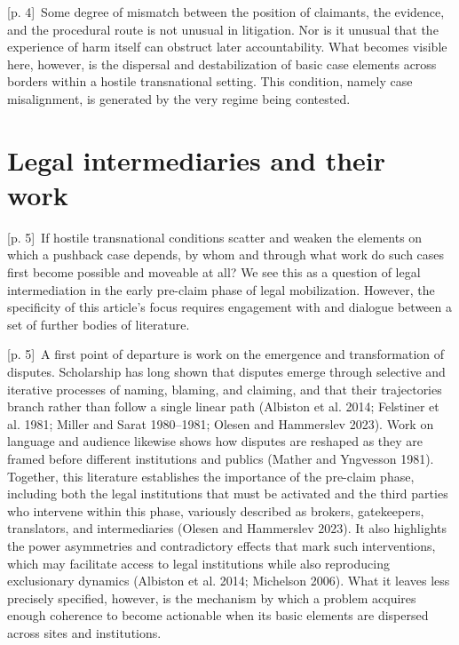 \documentclass[10pt,a4paper]{article}
\begin{document}
{\scriptsize\color{gray} [p. 4]}\ Some degree of mismatch between the position of claimants, the evidence, and the procedural route is not unusual in litigation. Nor is it unusual that the experience of harm itself can obstruct later accountability. What becomes visible here, however, is the dispersal and destabilization of basic case elements across borders within a hostile transnational setting. This condition, namely case misalignment, is generated by the very regime being contested.\par
{}\section*{Legal intermediaries and their work}
{\scriptsize\color{gray} [p. 5]}\ If hostile transnational conditions scatter and weaken the elements on which a pushback case depends, by whom and through what work do such cases first become possible and moveable at all? We see this as a question of legal intermediation in the early pre-claim phase of legal mobilization. However, the specificity of this article’s focus requires engagement with and dialogue between a set of further bodies of literature.\par
{\scriptsize\color{gray} [p. 5]}\ A first point of departure is work on the emergence and transformation of disputes. Scholarship has long shown that disputes emerge through selective and iterative processes of naming, blaming, and claiming, and that their trajectories branch rather than follow a single linear path (Albiston et al. 2014; Felstiner et al. 1981; Miller and Sarat 1980–1981; Olesen and Hammerslev 2023). Work on language and audience likewise shows how disputes are reshaped as they are framed before different institutions and publics (Mather and Yngvesson 1981). Together, this literature establishes the importance of the pre-claim phase, including both the legal institutions that must be activated and the third parties who intervene within this phase, variously described as brokers, gatekeepers, translators, and intermediaries (Olesen and Hammerslev 2023). It also highlights the power asymmetries and contradictory effects that mark such interventions, which may facilitate access to legal institutions while also reproducing exclusionary dynamics (Albiston et al. 2014; Michelson 2006). What it leaves less precisely specified, however, is the mechanism by which a problem acquires enough coherence to become actionable when its basic elements are dispersed across sites and institutions.\par
\end{document}
